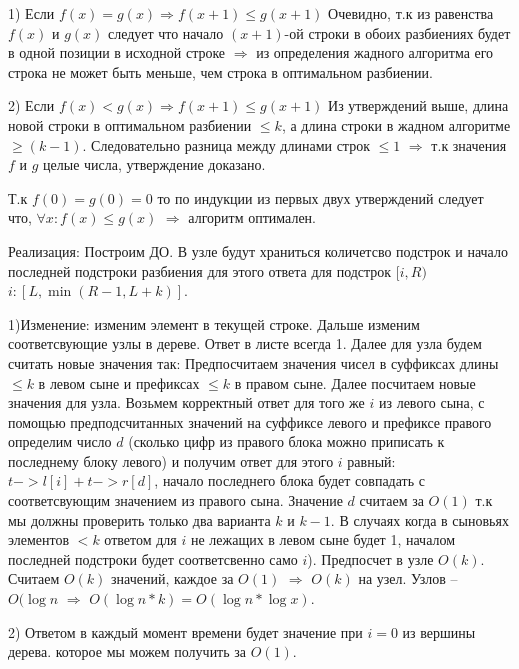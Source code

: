 \documentclass{article}
\begin{document}
\begin{flushleft}
1) Если $f(x) = g(x) \Rightarrow f(x + 1) \le g(x + 1)$ Очевидно, т.к из равенства $f(x)$ и $g(x)$ следует что начало $(x + 1)$-ой строки в обоих разбиениях будет в одной позиции в исходной строке $\Rightarrow$ из определения жадного алгоритма его строка не может быть меньше, чем строка в оптимальном разбиении.


2) Если $f(x) < g(x) \Rightarrow f(x + 1) \le g(x + 1)$ Из утверждений выше, длина новой строки в оптимальном разбиении $\le k$, а длина строки в жадном алгоритме $\ge (k - 1)$. Следовательно разница между длинами строк $\le 1$ $\Rightarrow$ т.к значения $f$ и $g$ целые числа, утверждение доказано.

Т.к $f(0) = g(0) = 0$ то по индукции из первых двух утверждений следует что, $ \forall x: f(x) \le g(x)$ $\Rightarrow$ алгоритм оптимален.

Реализация: Построим ДО. В узле будут храниться количетсво подстрок и начало последней подстроки разбиения для этого ответа для подстрок $[i, R)$ $i: [L, \min(R - 1, L + k)]$.

1)Изменение: изменим элемент в текущей строке. Дальше изменим соответсвующие узлы в дереве. Ответ в листе всегда 1. Далее для узла будем считать новые значения так: Предпосчитаем значения чисел в суффиксах длины $\le k$ в левом сыне и префиксах $\le k$ в правом сыне. Далее посчитаем новые значения для узла. Возьмем корректный ответ для того же $i$ из левого сына, с помощью предподсчитанных значений на суффиксе левого и префиксе правого определим число $d$ (сколько цифр из правого блока можно приписать к последнему блоку левого) и получим ответ для этого $i$ равный: $t->l[i] + t->r[d]$, начало последнего блока будет совпадать с соответсвующим значением из правого сына. Значение $d$ считаем за $O(1)$ т.к мы должны проверить только два варианта $k$ и $k - 1$. В случаях когда в сыновьях элементов $<k$ ответом для $i$ не лежащих в левом сыне будет 1, началом последней подстроки будет соответсвенно само $i$). Предпосчет в узле $O(k)$. Считаем $O(k)$ значений, каждое за $O(1)$ $\Rightarrow$ $O(k)$ на узел. Узлов -- $O(\log{n}$ $\Rightarrow$ $O(\log{n} * k) = O(\log{n} * \log{x})$.

2) Ответом в каждый момент времени будет значение при $i = 0$ из вершины дерева. которое мы можем получить за $O(1)$.

\section{}


\end{flushleft}
\end{document}
